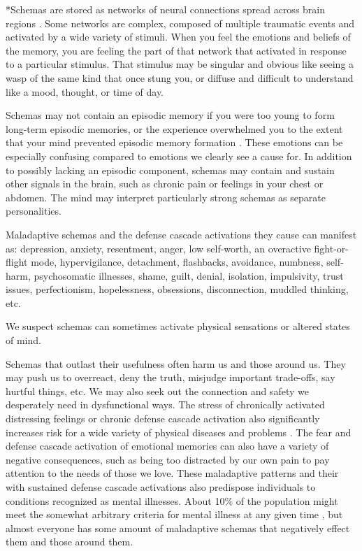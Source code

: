 \documentclass[12pt,letterpaper]{article}
\begin{document}
*Schemas are stored as networks of neural connections spread across brain regions \cite{eckerUnlocking}. Some networks are complex, composed of multiple traumatic events and activated by a wide variety of stimuli. When you feel the emotions and beliefs of the memory, you are feeling the part of that network that activated in response to a particular stimulus. That stimulus may be singular and obvious like seeing a wasp of the same kind that once stung you, or diffuse and difficult to understand like a mood, thought, or time of day. 

Schemas may not contain an episodic memory if you were too young to form long-term episodic memories, or the experience overwhelmed you to the extent that your mind prevented episodic memory formation \cite{vanderKolkBody,brownAttachmentDisturbances}. These emotions can be especially confusing compared to emotions we clearly see a cause for. In addition to possibly lacking an episodic component, schemas may contain and sustain other signals in the brain, such as chronic pain or feelings in your chest or abdomen. The mind may interpret particularly strong schemas as separate personalities.

Maladaptive schemas and the defense cascade activations they cause can manifest as: depression, anxiety, resentment, anger, low self-worth, an overactive fight-or-flight mode, hypervigilance, detachment, flashbacks, avoidance, numbness, self-harm, psychosomatic illnesses, shame, guilt, denial, isolation, impulsivity, trust issues, perfectionism, hopelessness, obsessions, disconnection, muddled thinking, etc. 

We suspect schemas can sometimes activate physical sensations or altered states of mind.

Schemas that outlast their usefulness often harm us and those around us. They may push us to overreact, deny the truth, misjudge important trade-offs, say hurtful things, etc. We may also seek out the connection and safety we desperately need in dysfunctional ways. The stress of chronically activated distressing feelings or chronic defense cascade activation also significantly increases risk for a wide variety of physical diseases and problems \cite{felittiACE}.  The fear and defense cascade activation of emotional memories can also have a variety of negative consequences, such as being too distracted by our own pain to pay attention to the needs of those we love. These maladaptive patterns and their with sustained defense cascade activations also predispose individuals to conditions recognized as mental illnesses. About 10\% of the population might meet the somewhat arbitrary criteria for mental illness at any given time \cite{whoMentalHealth}, but almost everyone has some amount of maladaptive schemas that negatively effect them and those around them.
\end{document}
